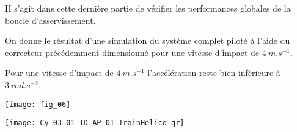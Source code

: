 \begin{obj}
II s'agit dans cette dernière partie de vérifier les performances globales de la boucle d'asservissement.
\end{obj}
\ifprof
\else
On donne le résultat d'une simulation du système complet piloté à l'aide du correcteur précédemment dimensionné pour une vitesse d'impact de $\SI{4}{m.s^{-1}}$.
\fi

\ifprof
\begin{corrige}
Pour une vitesse d'impact de $\SI{4}{m.s^{-1}}$ l'accélération reste bien inférieure à $\SI{3}{rad.s^{-2}}$.
\end{corrige}
\else
\fi

\ifprof
\else
\begin{marginfigure}
\texttt{[image: fig\_06]}
\end{marginfigure}

\fi


\ifprof
\else
\begin{marginfigure}%
\centering
\texttt{[image: Cy\_03\_01\_TD\_AP\_01\_TrainHelico\_qr]}
\end{marginfigure}
\fi


\ifprof
\else
\ifcolle
\else
{}
\fi
\fi

